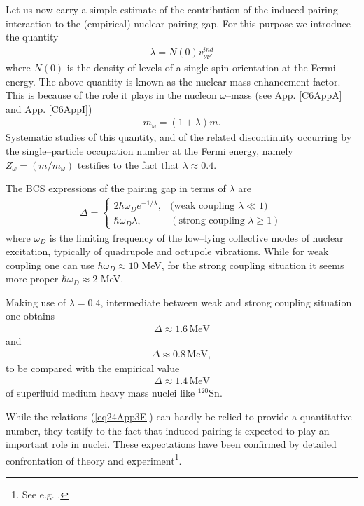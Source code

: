 \begin{subappendices}
Let us now carry a simple estimate of the contribution of the induced pairing interaction to the (empirical) nuclear pairing gap. For this purpose we introduce the quantity
 \begin{align}
\lambda=N(0)v_{\nu\nu'}^{ind}
 \end{align}
where $N(0)$ is the density of levels of a single spin orientation at the Fermi energy. The above quantity is known as the nuclear mass enhancement factor. This is because of the role it plays in the nucleon $\omega$--mass (see App. \ref{C6AppA} and App. \ref{C6AppI})
 \begin{align}
m_\omega=(1+\lambda)m.
 \end{align}
Systematic studies of this quantity, and of the related discontinuity occurring by the single--particle occupation number at the Fermi energy, namely $Z_\omega=(m/m_\omega)$ testifies to the fact that $\lambda\approx0.4$.


The BCS expressions of the pairing gap in terms of $\lambda$ are
\begin{align}\label{eq24App3E}
\Delta=\left\{\begin{array}{ll}
2\hbar\omega_De^{-1/\lambda},&\text{(weak coupling } \lambda\ll1)\\ 
\hbar\omega_D\lambda,&(\text{strong coupling }\lambda\geq1)
\end{array}
\right. 
\end{align}
where $\omega_D$ is the limiting frequency of the low--lying collective modes of nuclear excitation, typically of quadrupole and octupole vibrations. While for weak coupling one can use $\hbar\omega_D\approx10$ MeV, for the strong coupling situation it seems more proper $\hbar\omega_D\approx 2$ MeV.


Making use of $\lambda=0.4$, intermediate between weak and strong coupling situation one obtains
\begin{align}
\Delta\approx1.6\,\text{MeV}
\end{align}
and
\begin{align}
\Delta\approx0.8\,\text{MeV},
\end{align}
to be compared with the empirical value
\begin{align}
\Delta\approx1.4\,\text{MeV}
\end{align}
of superfluid medium heavy mass nuclei like $^{120}$Sn.

While the relations (\ref{eq24App3E}) can hardly be relied to provide a quantitative number, they testify to the fact that induced pairing is expected to play an important role in nuclei. These expectations have been confirmed by detailed confrontation of theory and experiment\footnote{See e.g. \cite{Idini:15}.}.

\end{subappendices}
